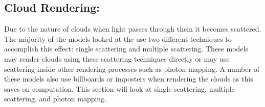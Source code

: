 \subsection{Cloud Rendering:}
\label{sec:cr}
Due to the nature of clouds when light passes through them it becomes scattered.
The majority of the models looked at the use two different techniques to accomplish this effect: single scattering and multiple scattering.
These models may render clouds using these scattering techniques directly or may use scattering inside other rendering processes such as photon mapping.
A number of these models also use billboards or imposters when rendering the clouds as this saves on computation.
This section will look at single scattering, multiple scattering, and photon mapping. 


